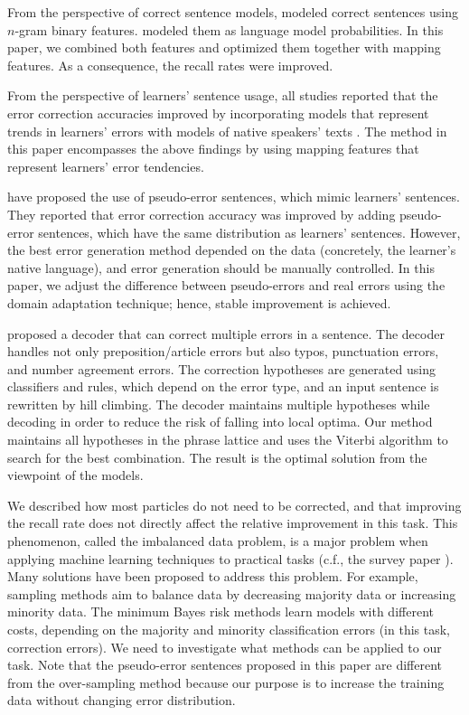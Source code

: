 \documentclass[english]{jnlp_1.4_rep}
\begin{document}
From the perspective of correct sentence models,
modeled correct sentences using $n$-gram binary
features. 
modeled them as language model probabilities. In this paper, we
combined both features and optimized them together with mapping
features. As a consequence, the recall rates were improved.


From the perspective of learners' sentence usage, all studies reported
that the error correction accuracies improved by incorporating models
that represent trends in learners' errors with models of native
speakers' texts
\cite{HAN10.821,gamon:2010:NAACLHLT,rozovskaya-roth:2010:EMNLP,Kasahara:CaseParticleCorrection2012j}. The
method in this paper encompasses the above findings by using mapping
features that represent learners' error tendencies.


 have proposed the use of
pseudo-error sentences, which mimic learners' sentences.  They
reported that error correction accuracy was improved by adding
pseudo-error sentences, which have the same distribution as learners'
sentences. However, the best error generation method depended on the
data (concretely, the learner's native language), and error generation
should be manually controlled. In this paper, we adjust the difference
between pseudo-errors and real errors using the domain adaptation
technique; hence, stable improvement is achieved.


 proposed a decoder that can
correct multiple errors in a sentence. The decoder handles not only
preposition/article errors but also typos, punctuation errors, and
number agreement errors. The correction hypotheses are generated using
classifiers and rules, which depend on the error type, and an input
sentence is rewritten by hill climbing. The decoder maintains multiple
hypotheses while decoding in order to reduce the risk of falling into
local optima. Our method maintains all hypotheses in the phrase
lattice and uses the Viterbi algorithm to search for the best
combination. The result is the optimal solution from the viewpoint of
the models.


We described how most particles do not need to be corrected, and that
improving the recall rate does not directly affect the relative
improvement in this task. This phenomenon, called the imbalanced data
problem, is a major problem when applying machine learning techniques
to practical tasks (c.f., the survey paper
). Many solutions have been proposed to
address this problem. For example, sampling methods aim to balance
data by decreasing majority data or increasing minority data. The
minimum Bayes risk methods learn models with different costs,
depending on the majority and minority classification errors (in this
task, correction errors). We need to investigate what methods can be
applied to our task. Note that the pseudo-error sentences proposed in
this paper are different from the over-sampling method because our
purpose is to increase the training data without changing error
distribution.
\end{document}

